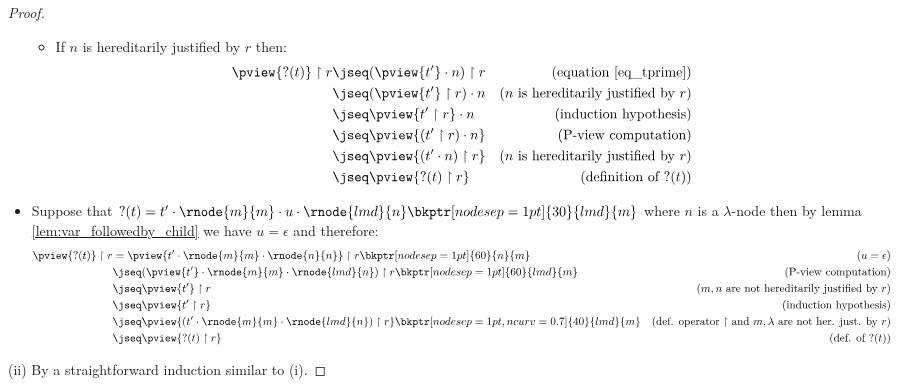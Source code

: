 \begin{proof}
\begin{itemize}
\begin{itemize}
    \item If $n$ is hereditarily justified by $r$ then:
    \begin{align*}
    \pview{?(t)} \upharpoonright  r
    &\jseq (\pview{t'} \cdot n) \upharpoonright  r      & (\mbox{equation \ref{eq_tprime}}) \\
    &\jseq (\pview{t'} \upharpoonright  r  ) \cdot n    & (n \mbox{ is hereditarily justified by } r)\\
    &\jseq \pview{t' \upharpoonright  r } \cdot n       & (\mbox{induction hypothesis}) \\
    &\jseq \pview{(t' \upharpoonright  r ) \cdot n }    & (\mbox{P-view computation}) \\
    &\jseq \pview{(t' \cdot n) \upharpoonright  r  }    & (n \mbox{ is hereditarily justified by } r) \\
    &\jseq \pview{?(t) \upharpoonright  r  }               & (\mbox{definition of } ?(t))
    \end{align*}
    \end{itemize}


\item Suppose that $?(t) =  t' \cdot \rnode{m}{m} \cdot  u \cdot \rnode{lmd}{n}
    \bkptr[nodesep=1pt]{30}{lmd}{m}$ where $n$ is a $\lambda$-node then by lemma
    \ref{lem:var_followedby_child} we have $u = \epsilon$ and therefore:
        \begin{align*}
        \pview{?(t)} \upharpoonright  r
        &= \pview{t' \cdot \rnode{m}{m} \cdot \rnode{n}{n}} \upharpoonright  r
               \bkptr[nodesep=1pt]{60}{n}{m}                   & (u=\epsilon)\\
        &\jseq (\pview{t'} \cdot \rnode{m}{m} \cdot \rnode{lmd}{n} ) \upharpoonright  r
               \bkptr[nodesep=1pt]{60}{lmd}{m}                 & (\mbox{P-view computation}) \\
        &\jseq \pview{t'} \upharpoonright  r                & (m, n \mbox{ are not hereditarily justified by } r) \\
        &\jseq \pview{t' \upharpoonright  r }               & \mbox{(induction hypothesis)} \\
        &\jseq \pview{ (t' \cdot \rnode{m}{m} \cdot \rnode{lmd}{n}) \upharpoonright r }
                        \bkptr[nodesep=1pt,ncurv=0.7]{40}{lmd}{m}
                                                            & (\mbox{def. operator $\upharpoonright$ and } m, \lambda \mbox{ are not her. just. by } r) \\
        &\jseq \pview{ ?(t) \upharpoonright r }                & \mbox{(def. of $?(t)$)}
        \end{align*}
\end{itemize}
(ii) By a straightforward induction similar to (i).
\end{proof}

